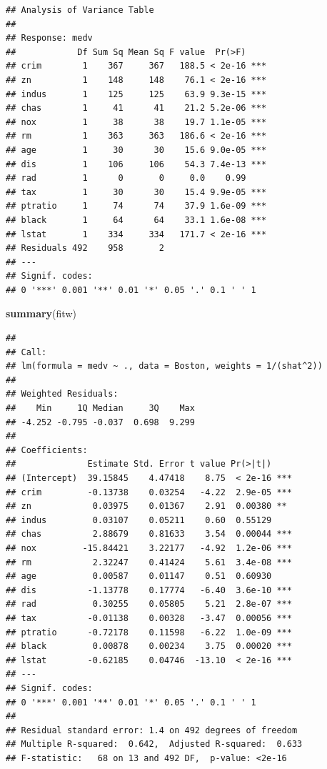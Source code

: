 \documentclass[
]{book}
\newenvironment{Shaded}{\begin{snugshade}}{\end{snugshade}}
\newcommand{\FunctionTok}[1]{\textcolor[rgb]{0.13,0.29,0.53}{\textbf{#1}}}
\newcommand{\NormalTok}[1]{#1}
\theoremstyle{definition}
\theoremstyle{definition}
\theoremstyle{definition}
\theoremstyle{definition}
\theoremstyle{remark}
\begin{document}
\begin{verbatim}
## Analysis of Variance Table
## 
## Response: medv
##            Df Sum Sq Mean Sq F value  Pr(>F)    
## crim        1    367     367   188.5 < 2e-16 ***
## zn          1    148     148    76.1 < 2e-16 ***
## indus       1    125     125    63.9 9.3e-15 ***
## chas        1     41      41    21.2 5.2e-06 ***
## nox         1     38      38    19.7 1.1e-05 ***
## rm          1    363     363   186.6 < 2e-16 ***
## age         1     30      30    15.6 9.0e-05 ***
## dis         1    106     106    54.3 7.4e-13 ***
## rad         1      0       0     0.0    0.99    
## tax         1     30      30    15.4 9.9e-05 ***
## ptratio     1     74      74    37.9 1.6e-09 ***
## black       1     64      64    33.1 1.6e-08 ***
## lstat       1    334     334   171.7 < 2e-16 ***
## Residuals 492    958       2                    
## ---
## Signif. codes:  
## 0 '***' 0.001 '**' 0.01 '*' 0.05 '.' 0.1 ' ' 1
\end{verbatim}

\begin{Shaded}
\begin{Highlighting}[]
\FunctionTok{summary}\NormalTok{(fitw)}
\end{Highlighting}
\end{Shaded}

\begin{verbatim}
## 
## Call:
## lm(formula = medv ~ ., data = Boston, weights = 1/(shat^2))
## 
## Weighted Residuals:
##    Min     1Q Median     3Q    Max 
## -4.252 -0.795 -0.037  0.698  9.299 
## 
## Coefficients:
##              Estimate Std. Error t value Pr(>|t|)    
## (Intercept)  39.15845    4.47418    8.75  < 2e-16 ***
## crim         -0.13738    0.03254   -4.22  2.9e-05 ***
## zn            0.03975    0.01367    2.91  0.00380 ** 
## indus         0.03107    0.05211    0.60  0.55129    
## chas          2.88679    0.81633    3.54  0.00044 ***
## nox         -15.84421    3.22177   -4.92  1.2e-06 ***
## rm            2.32247    0.41424    5.61  3.4e-08 ***
## age           0.00587    0.01147    0.51  0.60930    
## dis          -1.13778    0.17774   -6.40  3.6e-10 ***
## rad           0.30255    0.05805    5.21  2.8e-07 ***
## tax          -0.01138    0.00328   -3.47  0.00056 ***
## ptratio      -0.72178    0.11598   -6.22  1.0e-09 ***
## black         0.00878    0.00234    3.75  0.00020 ***
## lstat        -0.62185    0.04746  -13.10  < 2e-16 ***
## ---
## Signif. codes:  
## 0 '***' 0.001 '**' 0.01 '*' 0.05 '.' 0.1 ' ' 1
## 
## Residual standard error: 1.4 on 492 degrees of freedom
## Multiple R-squared:  0.642,  Adjusted R-squared:  0.633 
## F-statistic:   68 on 13 and 492 DF,  p-value: <2e-16
\end{verbatim}
\end{document}
